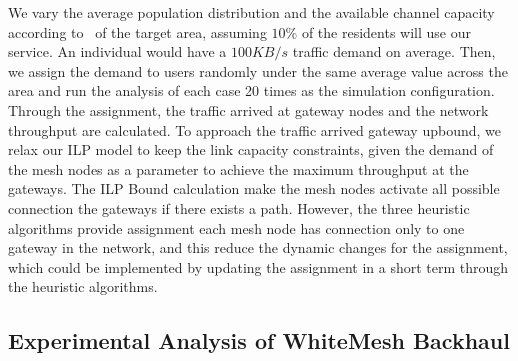 We vary the average population distribution and the available channel capacity according to~\cite{pcuiwinmee}
 of the target area, assuming $10\%$ of the residents will use
our service. An individual would have a $100 KB/s$ traffic demand on average. 
Then, we assign the demand to users randomly under the same average value across the area and run the analysis 
of each case 20 times as the simulation configuration. Through the assignment, the traffic arrived at gateway nodes
and the network throughput are calculated.
To approach the traffic arrived gateway upbound, we relax our ILP model to keep the link capacity constraints, 
given the demand of the mesh nodes as a parameter to achieve the maximum throughput at the gateways. 
The ILP Bound calculation make the mesh nodes activate all possible connection the gateways if 
there exists a path.
However, the three heuristic algorithms provide assignment each mesh node has connection only to one 
gateway in the network, and this reduce the dynamic changes for the assignment, which could be implemented
by updating the assignment in a short term through the heuristic algorithms.

\subsection{Experimental Analysis of WhiteMesh Backhaul}
\label{subsec:analysis}

